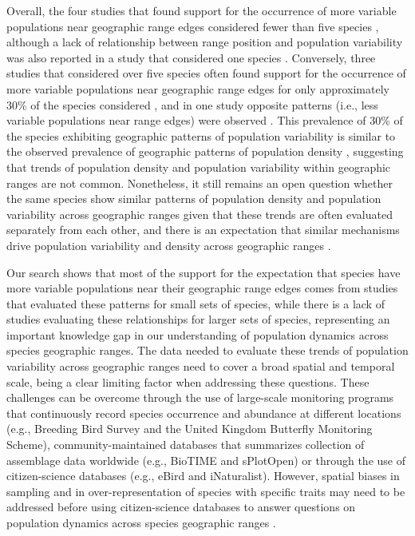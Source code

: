 Overall, the four studies that found support for the occurrence of more variable populations near geographic range edges considered fewer than five species \parencite{hansson1985,saitoh1998, williams2003, fukaya2014}, although a lack of relationship between range position and population variability was also reported in a study that considered one species \parencite{forchhammer1993}. Conversely, three studies that considered over five species often found support for the occurrence of more variable populations near geographic range edges for only approximately 30\% of the species considered \parencite{thomas1994, curnutt1996, oliver2012}, and in one study opposite patterns (i.e., less variable populations near range edges) were observed \parencite{saether2008}. This prevalence of 30\% of the species exhibiting geographic patterns of population variability is similar to the observed prevalence of geographic patterns of population density \parencite{sagarin2002, pironon2017}, suggesting that trends of population density and population variability within geographic ranges are not common. Nonetheless, it still remains an open question whether the same species show similar patterns of population density and population variability across geographic ranges given that these trends are often evaluated separately from each other, and there is an expectation that similar mechanisms drive population variability and density across geographic ranges \parencite{sagarin2002}.

Our search shows that most of the support for the expectation that species have more variable populations near their geographic range edges comes from studies that evaluated these patterns for small sets of species, while there is a lack of studies evaluating these relationships for larger sets of species, representing an important knowledge gap in our understanding of population dynamics across species geographic ranges. The data needed to evaluate these trends of population variability across geographic ranges need to cover a broad spatial and temporal scale, being a clear limiting factor when addressing these questions. These challenges can be overcome through the use of large-scale monitoring programs that continuously record species occurrence and abundance at different locations (e.g., Breeding Bird Survey and the United Kingdom Butterfly Monitoring Scheme), community-maintained databases that summarizes collection of assemblage data worldwide (e.g., BioTIME and sPlotOpen) or through the use of citizen-science databases (e.g., eBird and iNaturalist). However, spatial biases in sampling and in over-representation of species with specific traits may need to be addressed before using citizen-science databases to answer questions on population dynamics across species geographic ranges \parencite{bird2014,callaghan2021}.


